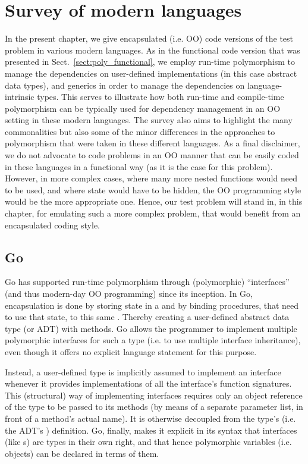 \documentclass[11pt,oneside]{report}
\newcommand{\code}[1]{{\selectfont\ttfamily{#1}}}
\begin{document}
\chapter{Survey of modern languages}
\label{chapt:survey}

In the present chapter, we give encapsulated (i.e. OO) code versions
of the test problem in various modern languages. As in the functional
code version that was presented in Sect.~\ref{sect:poly_functional},
we employ run-time polymorphism to manage the dependencies on
user-defined implementations (in this case abstract data types), and
generics in order to manage the dependencies on language-intrinsic
types. This serves to illustrate how both run-time and compile-time
polymorphism can be typically used for dependency management in an OO
setting in these modern languages. The survey also aims to highlight
the many commonalities but also some of the minor differences in the
approaches to polymorphism that were taken in these different
languages. As a final disclaimer, we do not advocate to code problems
in an OO manner that can be easily coded in these languages in a
functional way (as it is the case for this problem). However, in more
complex cases, where many more nested functions would need to be used,
and where state would have to be hidden, the OO programming style
would be the more appropriate one. Hence, our test problem will stand
in, in this chapter, for emulating such a more complex problem, that
would benefit from an encapsulated coding style.


\section{Go}

Go has supported run-time polymorphism through (polymorphic)
``interfaces'' (and thus modern-day OO programming) since its
inception. In Go, encapsulation is done by storing state in a
\code{struct} and by binding procedures, that need to use that
state, to this same \code{struct}. Thereby creating a user-defined
abstract data type (or ADT) with methods. Go allows the programmer to
implement multiple polymorphic interfaces for such a type (i.e. to use
multiple interface inheritance), even though it offers no explicit
language statement for this purpose.

Instead, a user-defined type is implicitly assumed to implement an
interface whenever it provides implementations of all the interface's
function signatures. This (structural) way of implementing interfaces
requires only an object reference of the type to be passed to its
methods (by means of a separate parameter list, in front of a method's
actual name). It is otherwise decoupled from the type's (i.e. the
ADT's \code{struct}) definition. Go, finally, makes it explicit in its
syntax that interfaces (like \code{struct}s) are types in their own
right, and that hence polymorphic variables (i.e. objects) can be
declared in terms of them.
\end{document}
